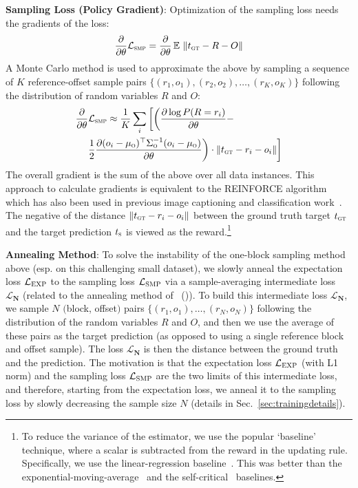 \documentclass[letterpaper]{article} %
\newcommand{\newcite}[1]{\citeauthor{#1} (\citeyear{#1})}
\DeclareMathOperator{\E}{\mathbb{E}\,}
\begin{document}
\textbf{Sampling Loss (Policy Gradient)}:
Optimization of the sampling loss needs the gradients of the loss:
\begin{align}
\frac{\partial}{\partial \theta} \mathcal{L}_\textsc{smp} = \frac{\partial}{\partial \theta} \E \left \Vert t_\textsc{gt} - R - O \right \Vert
\end{align}
A Monte Carlo method is used to approximate the above by sampling a sequence of $K$ reference-offset sample pairs
$\{(r_1, o_1), (r_2, o_2), \ldots, (r_K, o_K)\}$
following the distribution of random variables $R$ and $O$:
\begin{align}
\frac{\partial}{\partial \theta} &\mathcal{L}_\textsc{smp} \approx \frac{1}{K} \sum_i\bigg[\bigg(\frac{\partial \log P(R = r_i)}{\partial \theta} - \nonumber \\
&\frac{1}{2}\frac{\partial (o_i-\mu_\textsc{o})^{\top}\Sigma_\textsc{o}^{-1}(o_i-\mu_\textsc{o})}{\partial \theta}\bigg) \cdot \Vert t_\textsc{gt} - r_i - o_i \Vert \bigg]
\end{align}
The overall gradient is the sum of the above over all data instances. This approach to calculate gradients is equivalent to the REINFORCE algorithm~\cite{williams1992simple}
which has also been used in previous image captioning and classification work~\cite{xu2015show,mnih2014recurrent}.
The negative of the distance $\Vert t_\textsc{gt} - r_i - o_i \Vert$ between the ground truth target $t_\textsc{gt}$ and the target prediction $t_\textsc{s}$ is viewed as the reward.\footnote{To reduce the variance of the estimator, we use the popular `baseline' technique, where a scalar is subtracted from the reward in the updating rule. Specifically, we use the linear-regression baseline~\cite{williams1992simple,ranzato2015sequence}. This was better than the exponential-moving-average~\cite{williams1992simple} and the self-critical~\cite{Rennie2016self} baselines.
}

\textbf{Annealing Method}:
To solve the instability of the one-block sampling method above (esp. on this challenging small dataset), we slowly anneal the expectation loss $\mathcal{L}_\textsc{EXP}$ to the sampling loss $\mathcal{L}_\textsc{SMP}$ via a sample-averaging intermediate loss $\mathcal{L}_\mathbf{N}$ (related to the annealing method of~\newcite{ranzato2015sequence}).
%
To build this intermediate loss $\mathcal{L}_\mathbf{N}$, we sample $N$ $($block, offset$)$ pairs $\{(r_1, o_1), \ldots, (r_N, o_N)\}$ following the distribution of the random variables $R$ and $O$, and then we use the average of these pairs as the target prediction (as opposed to using a single reference block and offset sample). The loss $\mathcal{L}_\mathbf{N}$ is then the distance between the ground truth and the prediction.
The motivation is that the expectation loss $\mathcal{L}_{\textsc{EXP}}$ (with L1 norm) and the sampling loss $\mathcal{L}_{\textsc{SMP}}$ are the two limits of this intermediate loss,
and therefore, starting from the expectation loss, we anneal it to the sampling loss by slowly decreasing the sample size $N$ (details in Sec.~\ref{sec:trainingdetails}).
\end{document}
